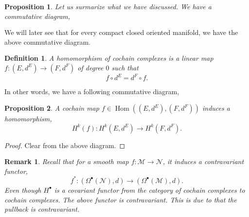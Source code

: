 \documentclass[10pt]{article}
\newtheorem{proposition}{Proposition}[section]
\newtheorem{definition}{Definition}[section]
\newtheorem{remark}{Remark}[section]
\DeclareMathOperator{\Hom}{Hom}
\newcommand{\R}[0]{\mathbb{R}}
\newcommand{\Z}[0]{\mathbb{Z}}
\newcommand{\M}[0]{\mathcal{M}}
\newcommand{\maniN}[0]{\mathcal{N}}
\begin{document}
\begin{proposition}
  Let us surmarize what we have discussed. We have a commutative diagram,
  \begin{center}
  \end{center}
\end{proposition}

We will later see that for every compact closed oriented manifold, we have the above commutative diagram.

\begin{definition}
  A homomorphism of cochain complexes is a linear map $f:(E,d^E)\to (F,d^F)$ of degree $0$ such that 
  \begin{equation*}
    f\circ d^E=d^F\circ f.
  \end{equation*}
\end{definition}

In other words, we have a following commutative diagram,

\begin{center}
\end{center}

\begin{proposition}
  A cochain map $f\in\Hom((E,d^E),(F,d^F))$ induces a homomorphism,
  \begin{equation*}
    H^k(f):H^k(E,d^E)\to H^k(F,d^F).
  \end{equation*}
\end{proposition}

\begin{proof}
  Clear from the above diagram.
\end{proof}

\begin{remark}
  Recall that for a smooth map $f:\M\to\maniN$, it induces a contravariant functor,
  \begin{equation*}
    f^*:(\Omega^\bullet(\maniN),d)\to(\Omega^\bullet(\M),d).
  \end{equation*}
  Even though $H^\bullet$ is a covariant functor from the category of cochain complexes to cochain complexes. The above functor is contravariant. This is due to that the pullback is contravariant.
\end{remark}
\end{document}

